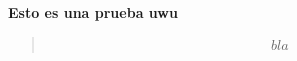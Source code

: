 \textbf{Esto es una prueba uwu}\vspace{.2cm}
\textcolor{bibi}{}
\begin{quote}
	\begin{align*}
		bla
	\end{align*}
\end{quote}
